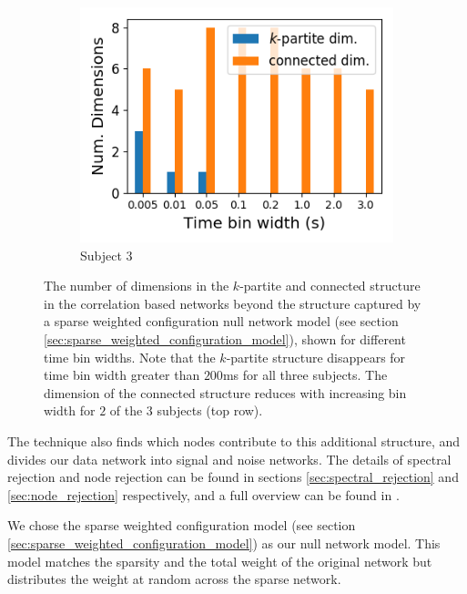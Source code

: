 \begin{figure}[p]
    \begin{subfigure}[h]{0.5\linewidth}
      \centering
      \includegraphics[width=\linewidth]{figures/eight_probe/Robbins_rectified_total_structure_dims.png}
      \caption{Subject 3}
      \label{fig:Robbins_rectified_total_structure_dims}
    \end{subfigure}
    \caption{The number of dimensions in the $k$-partite and connected structure in the correlation based networks beyond the structure captured by a sparse weighted configuration null network model (see section \ref{sec:sparse_weighted_configuration_model}), shown for different time bin widths. Note that the $k$-partite structure disappears for time bin width greater than $200$ms for all three subjects. The dimension of the connected structure reduces with increasing bin width for $2$ of the $3$ subjects (top row).}
    \label{fig:structure_dims}
  \end{figure}

  The technique also finds which nodes contribute to this additional structure, and divides our data network into signal and noise networks. The details of spectral rejection and node rejection can be found in sections \ref{sec:spectral_rejection} and \ref{sec:node_rejection} respectively, and a full overview can be found in \parencite{humphries}.

  We chose the sparse weighted configuration model (see section \ref{sec:sparse_weighted_configuration_model}) as our null network model. This model matches the sparsity and the total weight of the original network but distributes the weight at random across the sparse network.

